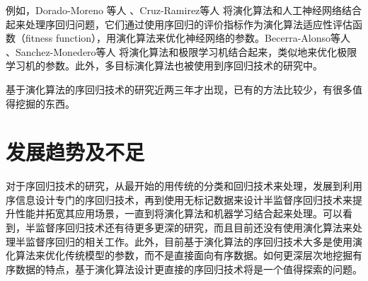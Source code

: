 例如，Dorado-Moreno 等人\citep{dorado2012ordinal}
、Cruz-Ramirez等人\citep{cruz2014metrics}\citep{cruz2013multiobjective}
将演化算法和人工神经网络结合起来处理序回归问题，它们通过使用序回归的评价指标作为演化算法适应性评估函数（fitness function），用演化算法来优化神经网络的参数。Becerra-Alonso等人\citep{becerra2012evolutionary}
、Sanchez-Monedero等人\citep{sanchez2013evolutionary}
将演化算法和极限学习机结合起来，类似地来优化极限学习机的参数。此外，多目标演化算法\citep{deb2001multi}也被使用到序回归技术的研究中\citep{cruz2013multiobjective}\citep{cruz2014metrics}。

基于演化算法的序回归技术的研究近两三年才出现，已有的方法比较少，有很多值得挖掘的东西。

\section{发展趋势及不足}
对于序回归技术的研究，从最开始的用传统的分类和回归技术来处理，发展到利用序信息设计专门的序回归技术，再到使用无标记数据来设计半监督序回归技术来提升性能并拓宽其应用场景，一直到将演化算法和机器学习结合起来处理。可以看到，半监督序回归技术还有待更多更深的研究，而且目前还没有使用演化算法来处理半监督序回归的相关工作。此外，目前基于演化算法的序回归技术大多是使用演化算法来优化传统模型的参数，而不是直接面向有序数据。如何更深层次地挖掘有序数据的特点，基于演化算法设计更直接的序回归技术将是一个值得探索的问题。



